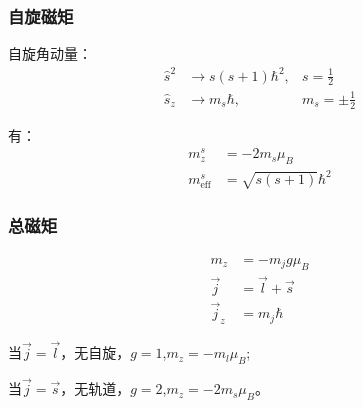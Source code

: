 \subsubsection{自旋磁矩}
自旋角动量：
\begin{align*}
    \hat{s}^2 &\to s(s+1)\hbar^2, &s=\frac{1}{2}\\
    \hat{s}_z &\to m_s \hbar,   &m_s=\pm \frac{1}{2}
\end{align*}

有：
\begin{align*}
    m_z^s &= -2m_s\mu_B\\
    m_{\text{eff}}^s &= \sqrt{s(s+1)}\hbar^2
\end{align*}

\subsubsection{总磁矩}
\begin{align*}
    m_z &= -m_j g \mu_B\\
    \vec{j} &= \vec{l} + \vec{s}\\
    \vec{j}_z &= m_j \hbar
\end{align*}

当$\vec{j} = \vec{l}$，无自旋，$g=1$,$m_z=-m_l\mu_B$;

当$\vec{j} = \vec{s}$，无轨道，$g=2$,$m_z=-2m_s\mu_B$。

